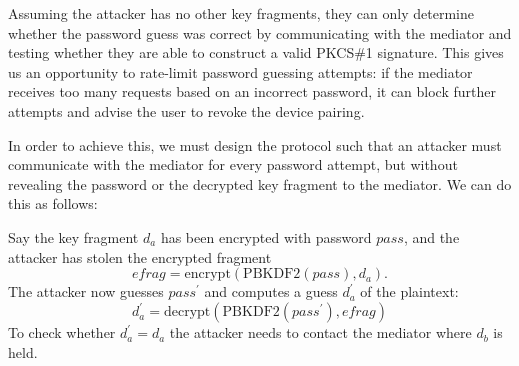 Assuming the attacker has no other key fragments, they can only determine whether the password guess
was correct by communicating with the mediator and testing whether they are able to construct a
valid PKCS\#1 signature. This gives us an opportunity to rate-limit password guessing attempts: if
the mediator receives too many requests based on an incorrect password, it can block further
attempts and advise the user to revoke the device pairing.

In order to achieve this, we must design the protocol such that an attacker must communicate with
the mediator for every password attempt, but without revealing the password or the decrypted key
fragment to the mediator. We can do this as follows:

Say the key fragment $d_a$ has been encrypted with password $\mathit{pass}$, and the attacker has
stolen the encrypted fragment
$$\mathit{efrag} = \mathrm{encrypt}(\mathrm{PBKDF2}(\mathit{pass}), d_a).$$
The attacker now guesses $\mathit{pass}^\prime$ and computes a guess $d_a^\prime$ of the plaintext:
$$d_a^\prime = \mathrm{decrypt}(\mathrm{PBKDF2}(\mathit{pass}^\prime), \mathit{efrag})$$
To check whether $d_a^\prime = d_a$ the attacker needs to contact the mediator where $d_b$ is held.

